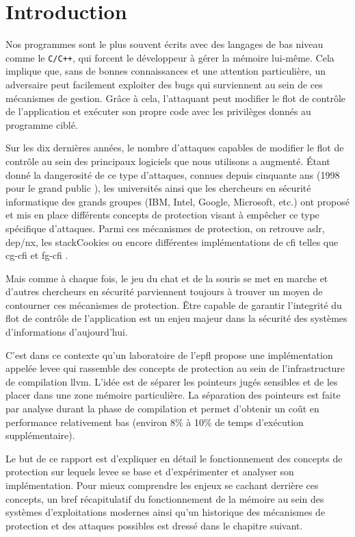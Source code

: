 \chapter{Introduction}
\label{chap:introduction}

Nos programmes sont le plus souvent écrits avec des langages de bas niveau comme le \texttt{C/C++}, qui forcent le développeur à gérer la mémoire lui-même. Cela implique que, sans de bonnes connaissances et une attention particulière, un adversaire peut facilement exploiter des bugs qui surviennent au sein de ces mécanismes de gestion. Grâce à cela, l’attaquant peut modifier le flot de contrôle de l'application et exécuter son propre code avec les privilèges donnés au programme ciblé.

Sur les dix dernières années, le nombre d'attaques capables de modifier le flot de contrôle au sein des principaux logiciels que nous utilisons a augmenté. Étant donné la dangerosité de ce type d’attaques, connues depuis cinquante ans (1998 pour le \og grand public \fg \cite{pharck49, SmashingTheStack}), les universités ainsi que les chercheurs en sécurité informatique des grands groupes (IBM, Intel, Google, Microsoft, etc.) ont proposé et mis en place différents concepts de protection visant à empêcher ce type spécifique d'attaques. Parmi ces mécanismes de protection, on retrouve \gls{aslr}, \gls{dep}/\gls{nx}, les \og \gls{stackCookies} \fg ou encore différentes implémentations de \og \gls{cfi} \fg telles que \og \gls{cg-cfi} \fg et \og \gls{fg-cfi} \fg.

Mais comme à chaque fois, le jeu du chat et de la souris se met en marche et d'autres chercheurs en sécurité parviennent toujours à trouver un moyen de contourner ces mécanismes de protection. Être capable de garantir l'integrité du flot de contrôle de l'application est un enjeu majeur dans la sécurité des systèmes d'informations d'aujourd'hui.

C'est dans ce contexte qu'un laboratoire de l’\gls{epfl} propose une implémentation appelée \gls{levee} qui rassemble des concepts de protection au sein de l’infrastructure de compilation \gls{llvm}. L’idée est de séparer les pointeurs jugés sensibles et de les placer dans une zone mémoire particulière. La séparation des pointeurs est faite par analyse durant la phase de compilation et permet d’obtenir un coût en performance relativement bas (environ 8\% à 10\% de temps d'exécution supplémentaire).

Le but de ce rapport est d’expliquer en détail le fonctionnement des concepts de protection sur lequels \gls{levee} se base et d’expérimenter et analyser son implémentation. Pour mieux comprendre les enjeux se cachant derrière ces concepts, un bref récapitulatif du fonctionnement de la mémoire au sein des systèmes d'exploitations modernes ainsi qu'un historique des mécanismes de protection et des attaques possibles est dressé dans le chapitre suivant.
